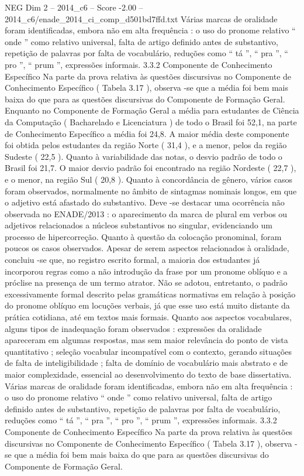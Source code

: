 \begin{textsample}{NEG Dim 2 – 2014\_c6 – Score -2.00 – 2014\_c6/enade\_2014\_ci\_comp\_d501bd7ffd.txt}
Várias marcas de oralidade foram identificadas, embora não em alta frequência : o uso do pronome relativo “ onde ” como relativo universal, falta de artigo definido antes de substantivo, repetição de palavras por falta de vocabulário, reduções como “ tá ”, “ pra ”, “ pro ”, “ prum ”, expressões informais. 3.3.2 Componente de Conhecimento Específico Na parte da prova relativa às questões discursivas no Componente de Conhecimento Específico ( Tabela 3.17 ), observa -se que a média foi bem mais baixa do que para as questões discursivas do Componente de Formação Geral.
Enquanto no Componente de Formação Geral a média para estudantes de Ciência da Computação ( Bacharelado e Licenciatura ) de todo o Brasil foi 52,1, na parte de Conhecimento Específico a média foi 24,8.
A maior média deste componente foi obtida pelos estudantes da região Norte ( 31,4 ), e a menor, pelos da região Sudeste ( 22,5 ).
Quanto à variabilidade das notas, o desvio padrão de todo o Brasil foi 21,7.
O maior desvio padrão foi encontrado na região Nordeste ( 22,7 ), e o menor, na região Sul ( 20,8 ).
Quanto à concordância de gênero, vários casos foram observados, normalmente no âmbito de sintagmas nominais longos, em que o adjetivo está afastado do substantivo.
Deve -se destacar uma ocorrência não observada no ENADE/2013 : o aparecimento da marca de plural em verbos ou adjetivos relacionados a núcleos substantivos no singular, evidenciando um processo de hipercorreção.
Quanto à questão da colocação pronominal, foram poucos os casos observados.
Apesar de serem aspectos relacionados à oralidade, concluiu -se que, no registro escrito formal, a maioria dos estudantes já incorporou regras como a não introdução da frase por um pronome oblíquo e a próclise na presença de um termo atrator.
Não se adotou, entretanto, o padrão excessivamente formal descrito pelas gramáticas normativas em relação à posição do pronome oblíquo em locuções verbais, já que esse uso está muito distante da prática cotidiana, até em textos mais formais.
Quanto aos aspectos vocabulares, alguns tipos de inadequação foram observados : expressões da oralidade apareceram em algumas respostas, mas sem maior relevância do ponto de vista quantitativo ; seleção vocabular incompatível com o contexto, gerando situações de falta de inteligibilidade ; falta de domínio de vocabulário mais abstrato e de maior complexidade, essencial ao desenvolvimento do texto de base dissertativa.
Várias marcas de oralidade foram identificadas, embora não em alta frequência : o uso do pronome relativo “ onde ” como relativo universal, falta de artigo definido antes de substantivo, repetição de palavras por falta de vocabulário, reduções como “ tá ”, “ pra ”, “ pro ”, “ prum ”, expressões informais. 3.3.2 Componente de Conhecimento Específico Na parte da prova relativa às questões discursivas no Componente de Conhecimento Específico ( Tabela 3.17 ), observa -se que a média foi bem mais baixa do que para as questões discursivas do Componente de Formação Geral.

\end{textsample}
